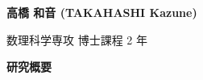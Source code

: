 

{\bf 高橋 和音 (TAKAHASHI Kazune)}



数理科学専攻 博士課程 2 年


\vspace{0.2cm}
\noindent
{\bf 研究概要}

\vspace{0.1cm}

